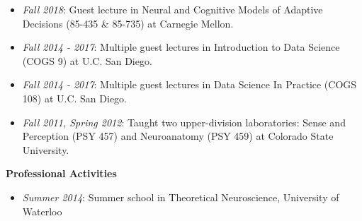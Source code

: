 \begin{itemize}
\tightlist
\item
  \emph{Fall 2018}: Guest lecture in Neural and Cognitive Models of
  Adaptive Decisions (85-435 \& 85-735) at Carnegie Mellon.
\item
  \emph{Fall 2014 - 2017}: Multiple guest lectures in Introduction to
  Data Science (COGS 9) at U.C. San Diego.
\item
  \emph{Fall 2014 - 2017}: Multiple guest lectures in Data Science In
  Practice (COGS 108) at U.C. San Diego.
\item
  \emph{Fall 2011, Spring 2012}: Taught two upper-division laboratories:
  Sense and Perception (PSY 457) and Neuroanatomy (PSY 459) at Colorado
  State University.
\end{itemize}

\textbf{Professional Activities}

\begin{itemize}
\tightlist
\item
  \emph{Summer 2014}: Summer school in Theoretical Neuroscience,
  University of Waterloo
\end{itemize}
